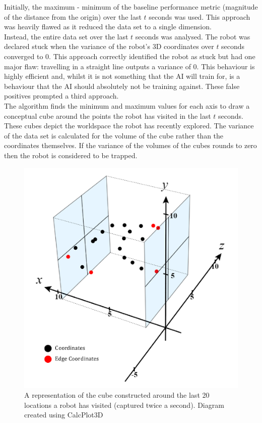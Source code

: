 \documentclass{article}
\begin{document}
Initially, the maximum - minimum of the baseline performance metric (magnitude of the distance from the origin) over the last $t$ seconds was used. This approach was heavily flawed as it reduced the data set to a single dimension. \\
Instead, the entire data set over the last $t$ seconds was analysed. The robot was declared stuck when the variance of the robot’s 3D coordinates over $t$ seconds converged to 0. This approach correctly identified the robot as stuck but had one major flaw: travelling in a straight line outputs a variance of 0. This behaviour is highly efficient and, whilst it is not something that the AI will train for, is a behaviour that the AI should absolutely not be training against. These false positives prompted a third approach. \\
The algorithm finds the minimum and maximum values for each axis to draw a conceptual cube around the points the robot has visited in the last $t$ seconds. These cubes depict the  worldspace the robot has recently explored. The variance of the data set is calculated for the volume of the cube rather than the coordinates themselves. If the variance of the volumes of the cubes rounds to zero then the robot is considered to be trapped. \\
\begin{figure}[H]
\centering
\includegraphics[scale=0.7]{trappedAlgorithm}
\caption{A representation of the cube constructed around the last 20 locations a robot has visited (captured twice a second). Diagram created using CalcPlot3D \citep{diagrams}}
\end{figure}
\end{document}
